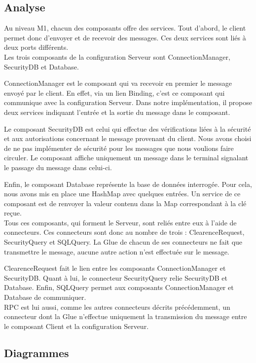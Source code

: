 \documentclass[11pt,a4paper]{article}
\begin{document}
\subsection{Analyse}
Au niveau M1, chacun des composants offre des services. Tout d'abord, le
client permet donc d'envoyer et de recevoir des messages. Ces deux services
sont liés à deux ports différents.\\


Les trois composants de la configuration Serveur sont ConnectionManager,
SecurityDB et Database.
 
ConnectionManager est le composant qui va recevoir en premier le message envoyé
par le client. En effet, via un lien Binding, c'est ce composant qui communique
avec la configuration Serveur. Dans notre implémentation, il propose deux
services indiquant l'entrée et la sortie du message dans le composant.

Le composant SecurityDB est celui qui effectue des vérifications liées à
la sécurité et aux autorisations concernant le message provenant du client.
Nous avons choisi de ne pas implémenter de sécurité pour les messages que nous
voulions faire circuler. Le composant affiche uniquement un message dans le
terminal signalant le passage du message dans celui-ci. 

Enfin, le composant Database représente la base de données interrogée. Pour
cela, nous avons mis en place une HashMap avec quelques entrées. Un service de
ce composant est de renvoyer la valeur contenu dans la Map correspondant à la
clé reçue.\\

Tous ces composants, qui forment le Serveur, sont reliés entre eux à l'aide de
connecteurs. Ces connecteurs sont donc au nombre de trois : ClearenceRequest,
SecurityQuery et SQLQuery. La Glue de chacun de ses connecteurs ne fait que
transmettre le message, aucune autre action n'est effectuée sur le message.

ClearenceRequest fait le lien entre les composants ConnectionManager et
SecurityDB. Quant à lui, le connecteur SecurityQuery relie SecurityDB et
Database. Enfin, SQLQuery permet aux composants ConnectionManager et Database
de communiquer.\\

RPC est lui aussi, comme les autres connecteurs décrits précédemment, un
connecteur dont la Glue n'effectue uniquement la transmission du message entre
le composant Client et la configuration Serveur.

\clearpage
\subsection{Diagrammes}
\end{document}
